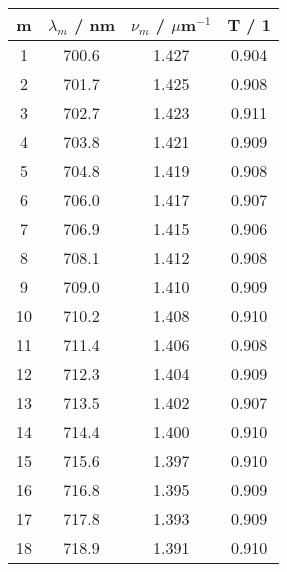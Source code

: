 \begin{tabular}{cccc}
m & $\lambda_m$ / nm & $\nu_m$ / $\mu$m${}^{-1}$ & T / 1 \\
\hline1 & 700.6 & 1.427 & 0.904\\
2 & 701.7 & 1.425 & 0.908\\
3 & 702.7 & 1.423 & 0.911\\
4 & 703.8 & 1.421 & 0.909\\
5 & 704.8 & 1.419 & 0.908\\
6 & 706.0 & 1.417 & 0.907\\
7 & 706.9 & 1.415 & 0.906\\
8 & 708.1 & 1.412 & 0.908\\
9 & 709.0 & 1.410 & 0.909\\
10 & 710.2 & 1.408 & 0.910\\
11 & 711.4 & 1.406 & 0.908\\
12 & 712.3 & 1.404 & 0.909\\
13 & 713.5 & 1.402 & 0.907\\
14 & 714.4 & 1.400 & 0.910\\
15 & 715.6 & 1.397 & 0.910\\
16 & 716.8 & 1.395 & 0.909\\
17 & 717.8 & 1.393 & 0.909\\
18 & 718.9 & 1.391 & 0.910\\
\end{tabular}
